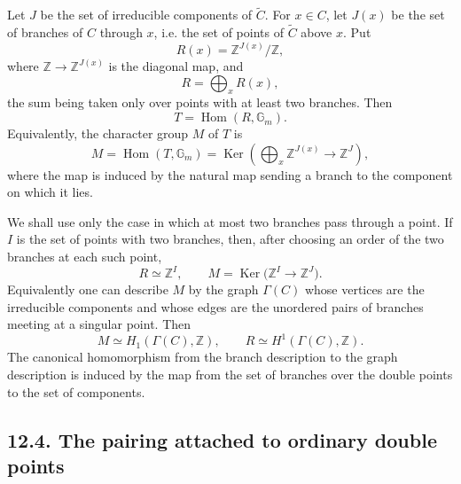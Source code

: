 \documentclass[11pt]{article}
\providecommand{\Hom}{\operatorname{Hom}}
\providecommand{\Ker}{\operatorname{Ker}}
\providecommand{\Z}{\mathbb Z}
\providecommand{\Gm}{\mathbb G_m}
\begin{document}
Let \(J\) be the set of irreducible components of \(\widetilde C\).  For \(x\in C\), let \(J(x)\) be the set of branches of \(C\) through \(x\), i.e. the set of points of \(\widetilde C\) above \(x\).  Put
\begin{equation}\tag{12.3.1}
        R(x)=\Z^{J(x)}/\Z,
\end{equation}
where \(\Z\to\Z^{J(x)}\) is the diagonal map, and
\begin{equation}\tag{12.3.2}
        R=\bigoplus_x R(x),
\end{equation}
the sum being taken only over points with at least two branches.  Then
\begin{equation}\tag{12.3.3}
        T=\Hom(R,\Gm).
\end{equation}
Equivalently, the character group \(M\) of \(T\) is
\begin{equation}\tag{12.3.4}
        M=\Hom(T,\Gm)=\Ker\left(\bigoplus_x\Z^{J(x)}\longrightarrow \Z^{J}\right),
\end{equation}
where the map is induced by the natural map sending a branch to the component on which it lies.

We shall use only the case in which at most two branches pass through a point.  If \(I\) is the set of points with two branches, then, after choosing an order of the two branches at each such point,
\begin{equation}\tag{12.3.6}
        R\simeq \Z^I,
        \qquad
        M=\Ker\bigl(\Z^I\longrightarrow \Z^J\bigr).
\end{equation}
Equivalently one can describe \(M\) by the graph \(\Gamma(C)\) whose vertices are the irreducible components and whose edges are the unordered pairs of branches meeting at a singular point.  Then
\begin{equation}\tag{12.3.7}
        M\simeq H_1(\Gamma(C),\Z),
        \qquad
        R\simeq H^1(\Gamma(C),\Z).
\end{equation}
The canonical homomorphism from the branch description to the graph description is induced by the map from the set of branches over the double points to the set of components.

\subsection*{12.4. The pairing attached to ordinary double points}
\end{document}
